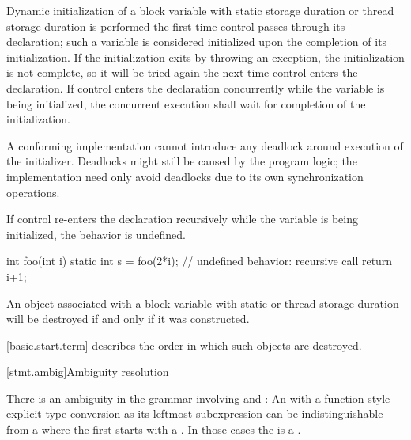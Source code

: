 \pnum
{}%
%
%
%
Dynamic initialization of a block variable with
static storage duration or
thread storage duration is performed
the first time control passes through its declaration; such a variable is
considered initialized upon the completion of its initialization. If the
initialization exits by throwing an exception, the initialization is not
complete, so it will be tried again the next time control enters the
declaration.
If control enters the declaration concurrently while the variable is
being initialized, the concurrent execution shall wait for completion
of the initialization.
\begin{note}
A conforming implementation cannot introduce
any deadlock around execution of the initializer.
Deadlocks might still be caused by the program logic;
the implementation need only avoid deadlocks
due to its own synchronization operations.
\end{note}
If control
re-enters the declaration recursively while
the variable is being initialized, the behavior is undefined.
\begin{example}
\begin{codeblock}
int foo(int i) {
  static int s = foo(2*i);      // undefined behavior: recursive call
  return i+1;
}
\end{codeblock}
\end{example}

\pnum
{}%
An object associated with
a block variable with static or thread storage duration
will be destroyed if and only if it was constructed.
\begin{note}
\ref{basic.start.term} describes the order in which such objects are destroyed.
\end{note}

[stmt.ambig]{Ambiguity resolution}%

\pnum
There is an ambiguity in the grammar involving
 and : An
 with a function-style explicit type
conversion as its leftmost subexpression can be
indistinguishable from a  where the first
 starts with a \tcode{(}. In those cases the
 is a .

